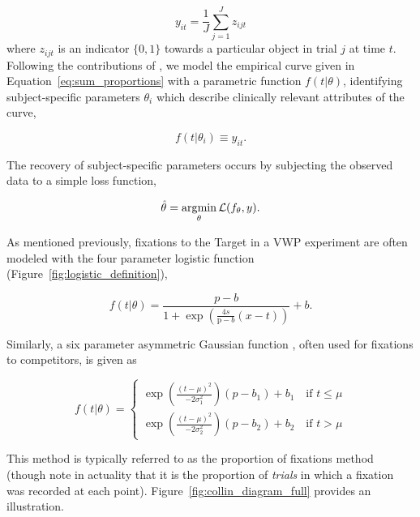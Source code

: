 \begin{equation}\label{eq:sum_proportions}
y_{it} = \frac1J \sum_{j=1}^J z_{ijt}
\end{equation}
where $z_{ijt}$ is an indicator $\{0, 1\}$  towards a particular object in trial $j$ at time $t$. Following the contributions of \citet{mcmurray2010individual}, we model the empirical curve given in Equation~\ref{eq:sum_proportions} with a parametric function $f(t|\theta)$, identifying subject-specific parameters $\theta_i$ which describe clinically relevant attributes of the curve, 

\begin{equation}\label{eq:empir_to_activation}
f(t | \theta_i) \equiv y_{it}.
\end{equation}

The recovery of subject-specific parameters occurs by subjecting the observed data to a simple loss function, 

\begin{equation}\label{eq:prop_loss}
\hat{\theta} = \operatorname*{arg\!\min}_{\theta} \mathcal{L}(f_{\theta}, y).
\end{equation}

As mentioned previously, fixations to the Target in a VWP experiment are often modeled with the four parameter logistic function (Figure~\ref{fig:logistic_definition}), 

\begin{equation} \label{eq:logistic}
f(t|\theta) = \frac{p-b}{1 + \exp \left(\frac{4s}{\text{p}-b} (x - t) \right)} + b.
\end{equation}

Similarly, a six parameter asymmetric Gaussian function , often used for fixations to competitors, is given as

\begin{equation} \label{eq:dg2}
f(t|\theta) = \begin{cases}
\exp \left( \frac{(t - \mu)^2}{-2\sigma_1^2} \right) (p - b_1) + b_1 \quad \text{if } t \leq \mu \\
\exp \left( \frac{(t - \mu)^2}{-2\sigma_2^2} \right) (p - b_2) + b_2 \quad \text{if } t > \mu
\end{cases}
\end{equation}

This method is typically referred to as the proportion of fixations method (though note in actuality that it is the proportion of \emph{trials} in which a fixation was recorded at each point). Figure~\ref{fig:collin_diagram_full} provides an illustration.

